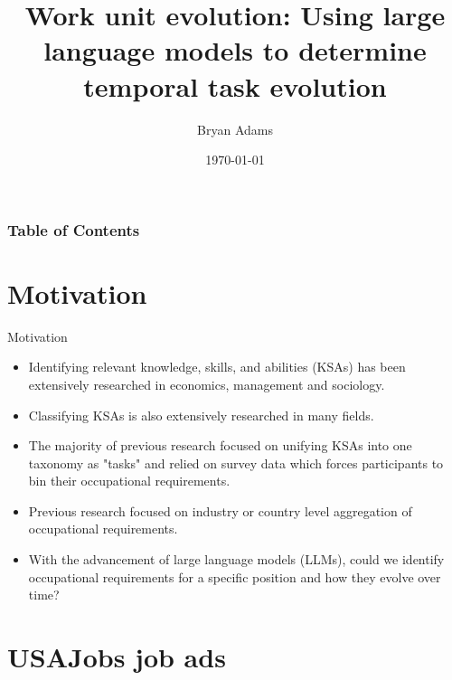 \documentclass{beamer}
\title{Work unit evolution: Using large language models to determine temporal task evolution}
\author{Bryan Adams}
\institute{George Mason University}
\date{\today}
\begin{document}
\begin{frame}
  \titlepage
\end{frame}

\begin{frame}
  \frametitle{Table of Contents}
  \tableofcontents
\end{frame}

\section{Motivation}

\begin{frame}{Motivation}
  \begin{itemize}
    \item Identifying relevant knowledge, skills, and abilities (KSAs) has been extensively researched in economics, management and sociology. \cite{investment_human_capital, task_specific, on_the_mechanics, diversification}
    \item Classifying KSAs is also extensively researched in many fields. \cite{specialization_career,industry-specific_human_capital, human_capital_specificity}
    \item The majority of previous research focused on unifying KSAs into one taxonomy as "tasks" and relied on survey data which forces participants to bin their occupational requirements.\cite{nested_skills, how_general_is_human_capital} 
    \item Previous research focused on industry or country level aggregation of occupational requirements.
    \item With the advancement of large language models (LLMs), could we identify occupational requirements for a specific position and how they evolve over time? 
  \end{itemize}
\end{frame}

\section{USAJobs job ads}
\end{document}
